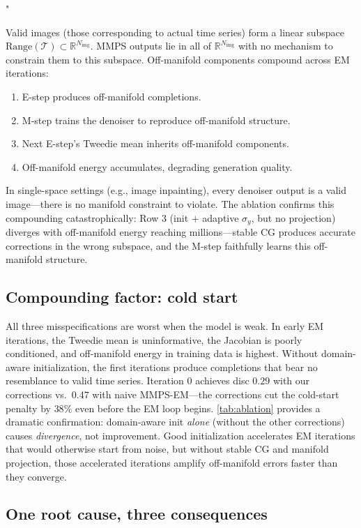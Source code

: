 "\documentclass{article}
\theoremstyle{plain}
\theoremstyle{definition}
\theoremstyle{remark}
\newcommand{\tsimg}{\mathcal{T}}
\newcommand{\Nimg}{N_{\mathrm{img}}}
\begin{document}
Valid images (those corresponding to actual time series) form a linear subspace $\mathrm{Range}(\tsimg) \subset \mathbb{R}^{\Nimg}$. MMPS outputs lie in all of $\mathbb{R}^{\Nimg}$ with no mechanism to constrain them to this subspace. Off-manifold components compound across EM iterations:
\begin{enumerate}
\setlength{\itemsep}{0pt}
\item E-step produces off-manifold completions.
\item M-step trains the denoiser to reproduce off-manifold structure.
\item Next E-step's Tweedie mean inherits off-manifold components.
\item Off-manifold energy accumulates, degrading generation quality.
\end{enumerate}
In single-space settings (e.g., image inpainting), every denoiser output is a valid image---there is no manifold constraint to violate. The ablation confirms this compounding catastrophically: Row $3$ (init $+$ adaptive $\sigma_y$, but no projection) diverges with off-manifold energy reaching millions---stable CG produces accurate corrections in the wrong subspace, and the M-step faithfully learns this off-manifold structure.

\subsection{Compounding factor: cold start}
\label{app:cold-start}

All three misspecifications are worst when the model is weak. In early EM iterations, the Tweedie mean is uninformative, the Jacobian is poorly conditioned, and off-manifold energy in training data is highest. Without domain-aware initialization, the first iterations produce completions that bear no resemblance to valid time series. Iteration $0$ achieves disc $0.29$ with our corrections vs.\ $0.47$ with naive MMPS-EM---the corrections cut the cold-start penalty by $38\%$ even before the EM loop begins. \cref{tab:ablation} provides a dramatic confirmation: domain-aware init \emph{alone} (without the other corrections) causes \emph{divergence}, not improvement. Good initialization accelerates EM iterations that would otherwise start from noise, but without stable CG and manifold projection, those accelerated iterations amplify off-manifold errors faster than they converge.

\subsection{One root cause, three consequences}
\end{document}
